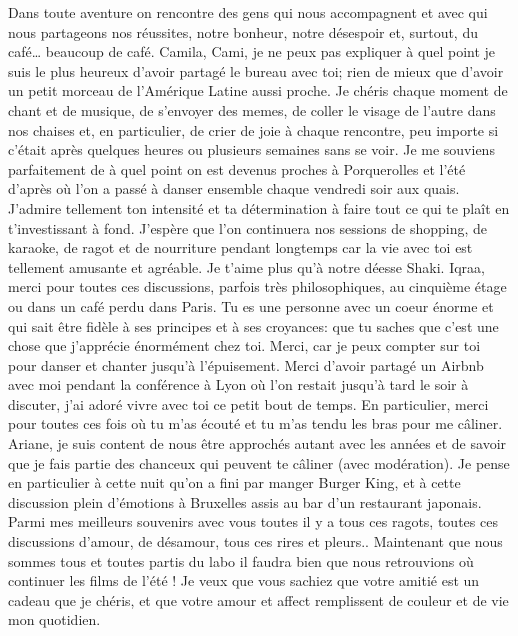 \vspace{5mm}
Dans toute aventure on rencontre des gens qui nous accompagnent et avec qui nous partageons nos réussites, notre bonheur, notre désespoir et, surtout, du café… beaucoup de café. Camila, Cami, je ne peux pas expliquer à quel point je suis le plus heureux d’avoir partagé le bureau avec toi; rien de mieux que d’avoir un petit morceau de l’Amérique Latine aussi proche. Je chéris chaque moment de chant et de musique, de s’envoyer des memes, de coller le visage de l’autre dans nos chaises et, en particulier, de crier de joie à chaque rencontre, peu importe si c’était après quelques heures ou plusieurs semaines sans se voir. Je me souviens parfaitement de à quel point on est devenus proches à Porquerolles et l'été d'après où l'on a passé à danser ensemble chaque vendredi soir aux quais. J’admire tellement ton intensité et ta détermination à faire tout ce qui te plaît en t’investissant à fond. J’espère que l’on continuera nos sessions de shopping, de karaoke, de ragot et de nourriture pendant longtemps car la vie avec toi est tellement amusante et agréable. Je t’aime plus qu’à notre déesse Shaki.
Iqraa, merci pour toutes ces discussions, parfois très philosophiques, au cinquième étage ou dans un café perdu dans Paris. Tu es une personne avec un coeur énorme et qui sait être fidèle à ses principes et à ses croyances: que tu saches que c’est une chose que j’apprécie énormément chez toi. Merci, car je peux compter sur toi pour danser et chanter jusqu’à l’épuisement. Merci d'avoir partagé un Airbnb avec moi pendant la conférence à Lyon où l'on restait jusqu'à tard le soir à discuter, j'ai adoré vivre avec toi ce petit bout de temps. En particulier, merci pour toutes ces fois où tu m’as écouté et tu m’as tendu les bras pour me câliner. 
Ariane, je suis content de nous être approchés autant avec les années et de savoir que je fais partie des chanceux qui peuvent te câliner (avec modération). Je pense en particulier à cette nuit qu'on a fini par manger Burger King, et à cette discussion plein d'émotions à Bruxelles assis au bar d'un restaurant japonais.
Parmi mes meilleurs souvenirs avec vous toutes il y a tous ces ragots, toutes ces discussions d’amour, de désamour, tous ces rires et pleurs..
Maintenant que nous sommes tous et toutes partis du labo il faudra bien que nous retrouvions où continuer les films de l’été !
Je veux que vous sachiez que votre amitié est un cadeau que je chéris, et que votre amour et affect remplissent de couleur et de vie mon quotidien.

